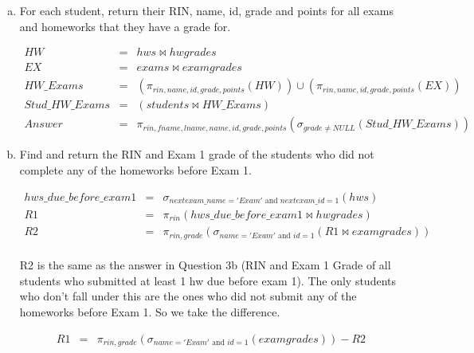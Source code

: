 \documentclass[11pt]{article}
\begin{document}
\begin{enumerate} [(a)]
\item For each student, return their RIN, name, id, grade and points
  for all exams and homeworks that they have a grade for.

\begin{eqnarray*}
HW & = & hws \bowtie hwgrades \\
EX & = & exams \bowtie examgrades \\
HW\_Exams & = &  (\pi_{rin, name, id, grade, points} (HW)) \cup (\pi_{rin, name, id, grade, points}(EX)) \\
Stud\_HW\_Exams & = & ( students \bowtie HW\_Exams) \\
Answer & = & \pi_{rin, fname, lname, name, id, grade, points} ( \sigma_{ grade \neq NULL } (Stud\_HW\_Exams) )
\end{eqnarray*}

\item Find and return the RIN and Exam 1 grade of the students who did
  not complete any of the homeworks before Exam 1.

\begin{eqnarray*}
hws\_due\_before\_exam1 & = & \sigma_{nextexam\_name = 'Exam' \mbox{ and } nextexam\_id=1} (hws) \\
R1 & = & \pi_{rin}  (hws\_due\_before\_exam1 \bowtie hwgrades) \\
R2 & = & \pi_{rin, grade} (\sigma_{ name = 'Exam' \mbox{ and } id=1} (R1 \bowtie examgrades))
\end{eqnarray*}
\\R2 is the same as the answer in Question 3b (RIN and Exam 1 Grade of all students who submitted at least 1 hw due before exam 1). The only students who don't fall under this are the ones who did not submit any of the homeworks before Exam 1. So we take the difference. 

\begin{eqnarray*}
R1 & = & \pi_{rin, grade} (\sigma_{name='Exam' \mbox{ and } id= 1} (examgrades))-R2 \\
\end{eqnarray*}


\end{enumerate}
\end{document}
